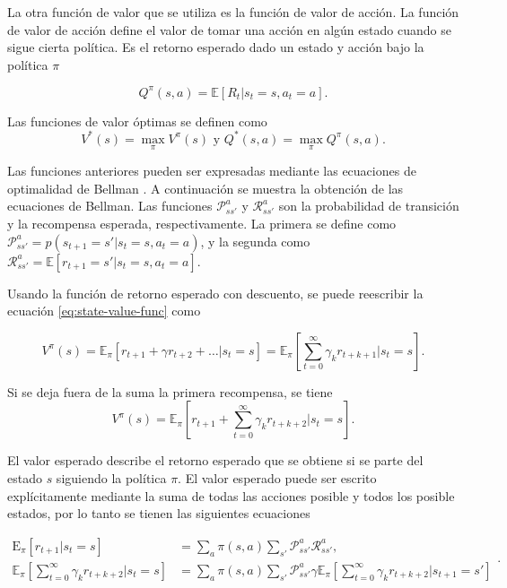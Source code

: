 La otra función de valor que se utiliza es la función de valor de acción.
La función de valor de acción define el valor de 
tomar una acción en algún estado cuando se sigue cierta política. Es el
retorno esperado dado un estado y acción bajo la política $\pi$

\begin{equation}\label{eq:action-value-func}
Q^\pi (s,a) = \mathbb{E}[R_t | s_t = s, a_t = a].    
\end{equation}

Las funciones de valor óptimas se definen como
\[
V^*(s) = \max_{\pi} V^\pi(s) \text{ y } Q^*(s, a) = \max_{\pi} Q^\pi (s,a).
\]


Las funciones anteriores pueden ser expresadas mediante las ecuaciones de optimalidad de Bellman \cite{bellman1966dynamic}.
A continuación se muestra la obtención de las ecuaciones
de Bellman.
Las funciones $\mathcal{P}_{ss'}^a$ y $\mathcal{R}_{ss'}^a$ son la probabilidad de transición y la recompensa esperada, respectivamente. La primera se define como
$\mathcal{P}_{ss'}^a = p(s_{t+1} = s' | s_t = s, a_t = a)$,
y la segunda como
$\mathcal{R}_{ss'}^a = \mathbb{E}[r_{t+1} = s' | s_t = s, a_t = a]$.

Usando la función de retorno esperado con descuento, se puede
reescribir la ecuación \ref{eq:state-value-func} como

\[
V^\pi(s) = \mathbb{E}_\pi[r_{t+1} + \gamma r_{t+2} + \dots | s_t = s] = \mathbb{E}_{\pi}[\sum_{t = 0}^\infty \gamma_{k} r_{t+k+1} | s_t =s].
\]


Si se deja fuera de la suma la primera recompensa, se tiene
\[
V^\pi(s) = \mathbb{E}_\pi[r_{t+1} + \sum_{t = 0}^\infty \gamma_{k} r_{t+k+2} | s_t =s].
\]

El valor esperado describe el retorno esperado que se obtiene si se parte del estado $s$ siguiendo la política $\pi$.
El valor esperado puede ser escrito explícitamente mediante la suma de todas
las acciones posible y todos los posible estados, por lo tanto se tienen las siguientes ecuaciones

\[
\begin{split}
\mathrm{E}_\pi[r_{t+1}| s_t=s] &= \sum_a \pi(s,a) \sum_{s'}\mathcal{P}_{ss'}^a\mathcal{R}_{ss'}^a,\\
\mathbb{E}_\pi[\sum_{t = 0}^\infty \gamma_{k} r_{t+k+2} | s_t =s] &=
\sum_a \pi(s,a) \sum_{s'}\mathcal{P}_{ss'}^a \gamma \mathbb{E}_\pi[\sum_{t = 0}^\infty \gamma_{k} r_{t+k+2} | s_{t+1} = s']
\end{split}.
\]

